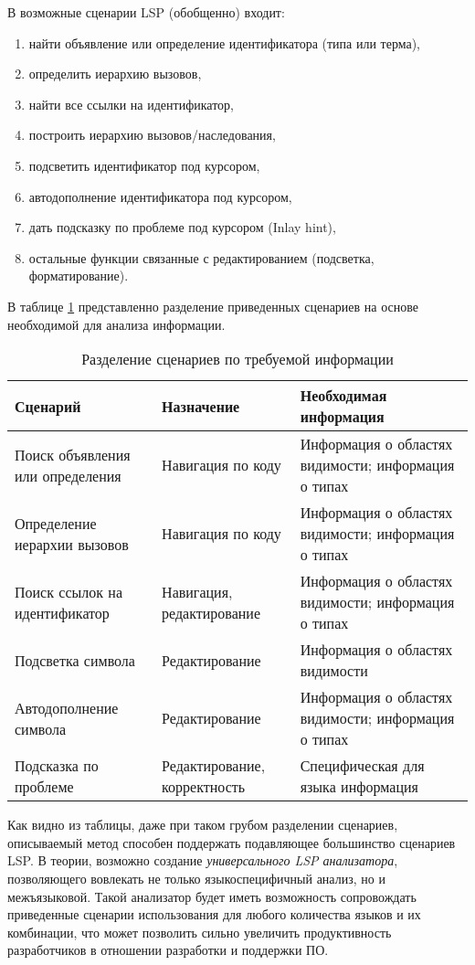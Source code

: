 В возможные сценарии LSP (обобщенно) входит:
\begin{enumerate}[label=\arabic*.]
    \item найти объявление или определение идентификатора (типа или терма),
    \item определить иерархию вызовов,
    \item найти все ссылки на идентификатор,
    \item построить иерархию вызовов/наследования,
    \item подсветить идентификатор под курсором,
    \item автодополнение идентификатора под курсором,
    \item дать подсказку по проблеме под курсором (Inlay hint),
    \item остальные функции связанные с редактированием (подсветка, форматирование).
\end{enumerate}


В таблице \ref{lsp_functionality} представленно разделение приведенных сценариев на основе необходимой для анализа информации.
\begin{table}[H]
    \caption{Разделение сценариев по требуемой информации}\label{lsp_functionality}
    \begin{tabular}{|p{5.0cm}|p{5.0cm}|p{5.0cm}|}
    \hline Сценарий & Назначение & Необходимая информация \\
    \hline Поиск объявления или определения & Навигация по коду & Информация о областях видимости; информация о типах \\
    \hline Определение иерархии вызовов & Навигация по коду & Информация о областях видимости; информация о типах \\
    \hline Поиск ссылок на идентификатор & Навигация, редактирование & Информация о областях видимости; информация о типах \\
    \hline Подсветка символа & Редактирование & Информация о областях видимости \\
    \hline Автодополнение символа & Редактирование & Информация о областях видимости; информация о типах \\
    \hline Подсказка по проблеме & Редактирование, корректность & Специфическая для языка информация \\
    \hline
    \end{tabular}
\end{table}

Как видно из таблицы, даже при таком грубом разделении сценариев, описываемый метод способен поддержать подавляющее
большинство сценариев LSP. В теории, возможно создание \textit{универсального LSP анализатора}, позволяющего вовлекать не только
языкоспецифичный анализ, но и межъязыковой. Такой анализатор будет иметь возможность сопровождать приведенные сценарии использования
для любого количества языков и их комбинации, что может позволить сильно увеличить продуктивность разработчиков в отношении
разработки и поддержки ПО.

\clearpage